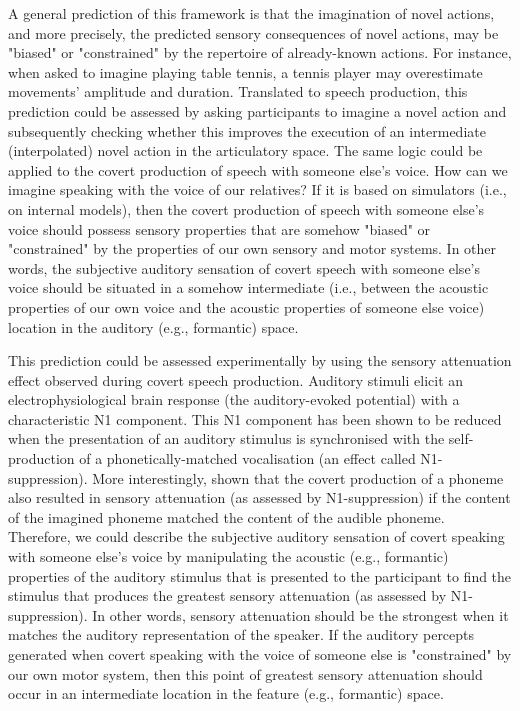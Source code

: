 \documentclass[utf8]{template/frontiersSCNS} %
\begin{document}
A general prediction of this framework is that the imagination of novel actions, and more precisely, the predicted sensory consequences of novel actions, may be "biased" or "constrained" by the repertoire of already-known actions. For instance, when asked to imagine playing table tennis, a tennis player may overestimate movements' amplitude and duration. Translated to speech production, this prediction could be assessed by asking participants to imagine a novel action and subsequently checking whether this improves the execution of an intermediate (interpolated) novel action in the articulatory space. The same logic could be applied to the covert production of speech with someone else's voice. How can we imagine speaking with the voice of our relatives? If it is based on simulators (i.e., on internal models), then the covert production of speech with someone else's voice should possess sensory properties that are somehow "biased" or "constrained" by the properties of our own sensory and motor systems. In other words, the subjective auditory sensation of covert speech with someone else's voice should be situated in a somehow intermediate (i.e., between the acoustic properties of our own voice and the acoustic properties of someone else voice) location in the auditory (e.g., formantic) space.


This prediction could be assessed experimentally by using the sensory attenuation effect observed during covert speech production. Auditory stimuli elicit an electrophysiological brain response (the auditory-evoked potential) with a characteristic N1 component. This N1 component has been shown to be reduced when the presentation of an auditory stimulus is synchronised with the self-production of a phonetically-matched vocalisation (an effect called N1-suppression). More interestingly, \cite{whitford_neurophysiological_2017} shown that the covert production of a phoneme also resulted in sensory attenuation (as assessed by N1-suppression) if the content of the imagined phoneme matched the content of the audible phoneme. Therefore, we could describe the subjective auditory sensation of covert speaking with someone else’s voice by manipulating the acoustic (e.g., formantic) properties of the auditory stimulus that is presented to the participant to find the stimulus that produces the greatest sensory attenuation (as assessed by N1-suppression). In other words, sensory attenuation should be the strongest when it matches the auditory representation of the speaker. If the auditory percepts generated when covert speaking with the voice of someone else is "constrained" by our own motor system, then this point of greatest sensory attenuation should occur in an intermediate location in the feature (e.g., formantic) space.
\end{document}
